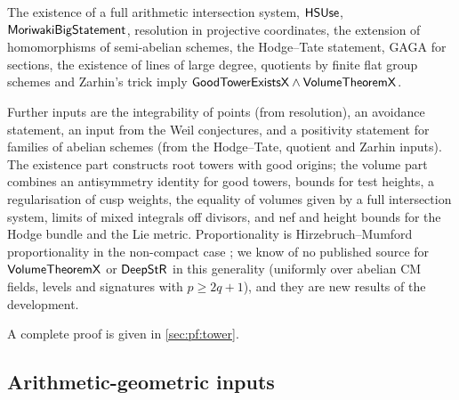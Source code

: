 \begin{theorem}\Fmark\label{thm:tower}
The existence of a full arithmetic intersection system, $\mathsf{HSUse}$, $\mathsf{MoriwakiBigStatement}$,
resolution in projective coordinates, the extension of homomorphisms of semi-abelian schemes, the
Hodge--Tate statement, GAGA for sections, the existence of lines of large degree, quotients by finite
flat group schemes and Zarhin's trick imply $\mathsf{GoodTowerExistsX}\wedge\mathsf{VolumeTheoremX}$.
\end{theorem}

\begin{proofoutline}
Further inputs are the integrability of points (from resolution), an avoidance statement, an input from
the Weil conjectures, and a positivity statement for families of abelian schemes (from the Hodge--Tate,
quotient and Zarhin inputs). The existence part constructs root towers with good origins; the volume
part combines an antisymmetry identity for good towers, bounds for test heights, a regularisation of
cusp weights, the equality of volumes given by a full intersection system, limits of mixed integrals off
divisors, and nef and height bounds for the Hodge bundle and the Lie metric. Proportionality is
Hirzebruch--Mumford proportionality in the non-compact case \cite{Mumford1977}; we know of no published
source for $\mathsf{VolumeTheoremX}$ or $\mathsf{DeepStR}$ in this generality (uniformly over abelian CM
fields, levels and signatures with $p\ge2q+1$), and they are new results of the development.

A complete proof is given in \cref{sec:pf:tower}.
\end{proofoutline}

\subsection{Arithmetic-geometric inputs}\label{sec:covolume:inputs}


